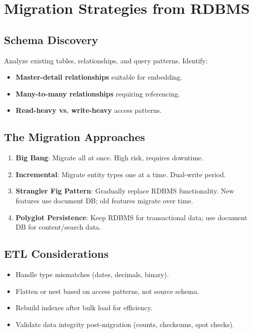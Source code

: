 \documentclass[12pt,a4paper]{article}
\begin{document}
\section{Migration Strategies from RDBMS}

\subsection{Schema Discovery}

Analyze existing tables, relationships, and query patterns. Identify:
\begin{itemize}[noitemsep]
    \item \textbf{Master-detail relationships} suitable for embedding.
    \item \textbf{Many-to-many relationships} requiring referencing.
    \item \textbf{Read-heavy vs. write-heavy} access patterns.
\end{itemize}

\subsection{The Migration Approaches}

\begin{enumerate}[noitemsep]
    \item \textbf{Big Bang}: Migrate all at once. High risk, requires downtime.
    \item \textbf{Incremental}: Migrate entity types one at a time. Dual-write period.
    \item \textbf{Strangler Fig Pattern}: Gradually replace RDBMS functionality. New features use document DB; old features migrate over time.
    \item \textbf{Polyglot Persistence}: Keep RDBMS for transactional data; use document DB for content/search data.
\end{enumerate}

\subsection{ETL Considerations}

\begin{itemize}[noitemsep]
    \item Handle type mismatches (dates, decimals, binary).
    \item Flatten or nest based on access patterns, not source schema.
    \item Rebuild indexes after bulk load for efficiency.
    \item Validate data integrity post-migration (counts, checksums, spot checks).
\end{itemize}
\end{document}
